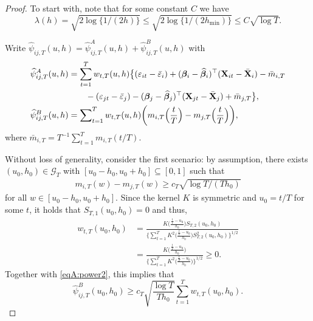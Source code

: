 \begin{proof}
To start with, note that for some constant $C$ we have
\begin{equation}\label{eqA:power:lambda}
\lambda(h) = \sqrt{2\log\{1/(2h)\}} \le \sqrt{2\log\{1/(2h_{\min})\}} \le C \sqrt{\log T}.
\end{equation}

Write $\widehat{\psi}_{ij, T}(u,h) = \widehat{\psi}_{ij, T}^A(u,h) + \widehat{\psi}_{ij, T}^B(u,h)$ with 
\begin{align*}
\widehat{\psi}^A_{ij,T}(u,h) &= \sum_{t=1}^T w_{t,T}(u,h) \big\{ (\varepsilon_{it} - \bar{\varepsilon}_i) + (\bm{\beta}_i - \widehat{\bm{\beta}}_i)^\top (\mathbf{X}_{it} - \bar{\mathbf{X}}_{i}) - \bar{m}_{i, T} \\
& \quad \quad - (\varepsilon_{jt} - \bar{\varepsilon}_j) -  (\bm{\beta}_j - \widehat{\bm{\beta}}_j)^\top (\mathbf{X}_{jt} - \bar{\mathbf{X}}_{j}) + \bar{m}_{j, T} \big\},\\
\widehat{\psi}_{ij, T}^B(u,h) &= \sum\nolimits_{t=1}^T w_{t,T}(u,h) \bigg(m_{i, T}\Big(\frac{t}{T}\Big) - m_{j, T}\Big(\frac{t}{T}\Big) \bigg),
\end{align*}
where $\bar{m}_{i, T} = T^{-1} \sum_{t=1}^T m_{i, T} (t/T)$. 

Without loss of generality, consider the first scenario: by assumption, there exists $(u_0,h_0) \in \mathcal{G}_T$ with $[u_0-h_0,u_0+h_0] \subseteq [0,1]$ such that \begin{align}\label{eqA:power2}
m_{i,T}(w) - m_{j,T}(w) \ge c_T \sqrt{\log T/(Th_0)}
\end{align}
for all $w \in [u_0-h_0,u_0+h_0]$. Since the kernel $K$ is symmetric and $u_0 = t/T$ for some $t$, it holds that $S_{T,1}(u_0,h_0) = 0$ and thus,
\begin{align} w_{t,T}(u_0,h_0) &= \frac{K\Big(\frac{\frac{t}{T}-u_0}{h_0}\Big) S_{T, 2}(u_0, h_0)}{\Big\{ \sum_{t=1}^T K^2\Big(\frac{\frac{t}{T}-u_0}{h_0}\Big)S^2_{T, 2}(u_0, h_0) \Big\}^{1/2}} \\
&=\frac{K\Big(\frac{\frac{t}{T}-u_0}{h_0}\Big)}{\Big\{ \sum_{t=1}^T K^2\Big(\frac{\frac{t}{T}-u_0}{h_0}\Big)\Big\}^{1/2}} \ge 0.
\end{align}
Together with \eqref{eqA:power2}, this implies that 
\begin{equation}\label{eq1-proof-prop-test-power}
\widehat{\psi}_{ij, T}^B(u_0,h_0) \ge c_T \sqrt{\frac{\log T}{Th_0}} \sum\limits_{t=1}^T w_{t,T}(u_0,h_0).
\end{equation}


\end{proof}
